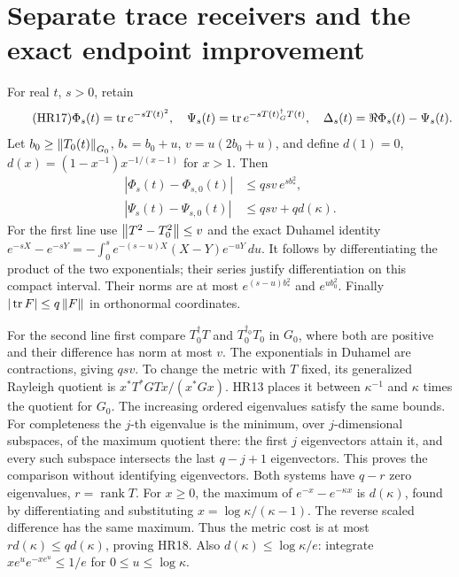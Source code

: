 \section{Separate trace receivers and the exact endpoint improvement}

For real \(t\), \(s>0\), retain
\begin{equation}\tag{HR17}\label{hrv:HR17}
\Phi_s(t)=\operatorname{tr} e^{-sT(t)^2},\quad
\Psi_s(t)=\operatorname{tr} e^{-sT(t)^\dagger_G T(t)},\quad
\Delta_s(t)=\Re\Phi_s(t)-\Psi_s(t).
\end{equation}
Let \(b_0\ge\left\lVert T_0(t)\right\rVert_{G_0}\), \(b_*=b_0+u\),
\(v=u(2b_0+u)\), and define
\(d(1)=0\), \(d(x)=(1-x^{-1})x^{-1/(x-1)}\) for \(x>1\).
Then
\begin{equation}\tag{HR18}\label{hrv:HR18}
\begin{split}
|\Phi_s(t)-\Phi_{s,0}(t)|&\le qsv\,e^{s b_*^2},\\
|\Psi_s(t)-\Psi_{s,0}(t)|&\le qsv+q d(\kappa).
\end{split}
\end{equation}
For the first line use \(\left\lVert T^2-T_0^2\right\rVert\le v\) and the exact
Duhamel identity
\(e^{-sX}-e^{-sY}=-\int_0^s e^{-(s-u)X}(X-Y)e^{-uY}\,du\).
It follows by differentiating the product of the two exponentials;
their series justify differentiation on this compact interval.
Their norms are at most \(e^{(s-u)b_*^2}\) and \(e^{ub_0^2}\).
Finally \(|\operatorname{tr} F|\le q\left\lVert F\right\rVert\) in orthonormal coordinates.

For the second line first compare \(T^\dagger_0T\) and
\(T_0^{\dagger_0}T_0\) in \(G_0\), where both are positive and their
difference has norm at most \(v\). The exponentials in Duhamel are
contractions, giving \(qsv\). To change the metric with \(T\) fixed,
its generalized Rayleigh quotient is
\(x^*T^*GTx/(x^*Gx)\). HR13 places it between \(\kappa^{-1}\) and
\(\kappa\) times the quotient for \(G_0\). The increasing ordered
eigenvalues satisfy the same bounds. For completeness the \(j\)-th
eigenvalue is the minimum, over \(j\)-dimensional subspaces, of the
maximum quotient there: the first \(j\) eigenvectors attain it, and
every such subspace intersects the last \(q-j+1\) eigenvectors.
This proves the comparison without identifying eigenvectors.
Both systems have \(q-r\) zero eigenvalues, \(r=\operatorname{rank}T\).
For \(x\ge0\), the maximum of \(e^{-x}-e^{-\kappa x}\) is
\(d(\kappa)\), found by differentiating and substituting
\(x=\log\kappa/(\kappa-1)\). The reverse scaled difference has
the same maximum. Thus the metric cost is at most
\(r d(\kappa)\le qd(\kappa)\), proving HR18.
Also \(d(\kappa)\le\log\kappa/e\): integrate
\(xe^u e^{-xe^u}\le1/e\) for \(0\le u\le\log\kappa\).

